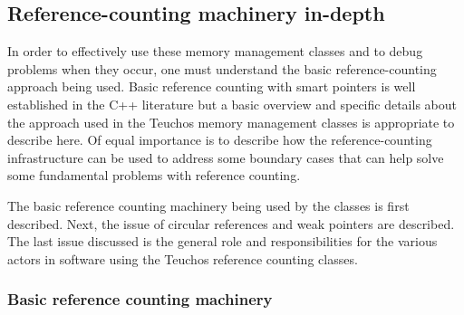 \documentclass[pdf,ps2pdf,11pt]{SANDreport}
\begin{document}
%
{}\subsection{Reference-counting machinery in-depth}
\label{sec:reference-counting-machinary}
%

In order to effectively use these memory management classes and to
debug problems when they occur, one must understand the basic
reference-counting approach being used.  Basic reference counting with
smart pointers is well established in the C++ literature
{}\cite{MoreEffectiveC++96} but a basic overview and specific details
about the approach used in the Teuchos memory management classes is
appropriate to describe here.  Of equal importance is to describe how
the reference-counting infrastructure can be used to address some
boundary cases that can help solve some fundamental problems with
reference counting.

The basic reference counting machinery being used by the classes is
first described.  Next, the issue of circular references and weak
pointers are described.  The last issue discussed is the general role
and responsibilities for the various actors in software using the
Teuchos reference counting classes.


%
{}\subsubsection{Basic reference counting machinery}
\label{sec:basic-reference-counting-machinery}
%
\end{document}
